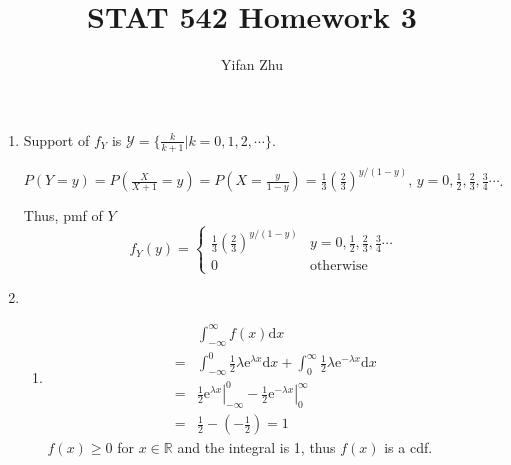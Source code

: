 \documentclass{article}
\begin{document}
	

	
	\title{STAT 542 Homework 3}
	\author{Yifan Zhu}
	\maketitle
	
	\begin{enumerate}[leftmargin = 0 em, label = \arabic*., font = \bfseries]
	\item Support of $f_Y$ is $\mathcal{Y} = \{\frac{k}{k+1}|k = 0, 1, 2, \cdots\}$. 

	$P(Y = y) = P(\frac{X}{X+1} = y) = P(X = \frac{y}{1 - y}) = \frac{1}{3} (\frac{2}{3})^{y/(1-y)},\, y = 0, \frac{1}{2}, \frac{2}{3}, \frac{3}{4} \cdots$.

	Thus, pmf of $Y$ 
	\[f_Y (y) = \begin{cases}
	\frac{1}{3} (\frac{2}{3})^{y/(1-y)} & y = 0, \frac{1}{2}, \frac{2}{3}, \frac{3}{4} \cdots\\
	0 & \mathrm{otherwise}
	\end{cases}\]
	
	\item \begin{enumerate}
		\item 
	\begin{align*}
	&\int_{-\infty}^{\infty} f(x) \mathrm{d}x \\
	=& \int_{-\infty}^0 \frac{1}{2} \lambda \mathrm{e}^{\lambda x} \mathrm{d}x + \int_{0}^{\infty} \frac{1}{2} \lambda \mathrm{e}^{- \lambda x}\mathrm{d}x\\
	=& \left. \frac{1}{2} \mathrm{e}^{\lambda x}\right|_{-\infty}^0 -   \left. \frac{1}{2} \mathrm{e}^{-\lambda x}\right|_{0}^\infty\\
	= & \frac{1}{2} - (- \frac{1}{2}) = 1
	\end{align*}
$f(x) \geq 0$ for $x \in \mathbb{R}$ and the integral is 1, thus $f(x)$ is a cdf.


\end{enumerate}
\end{enumerate}
\end{document}
